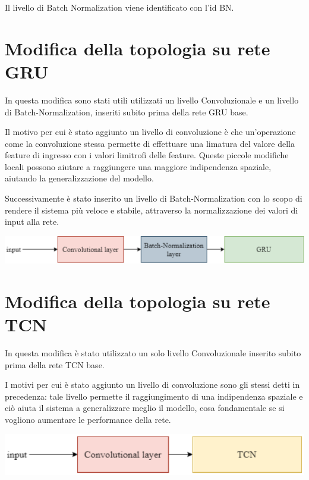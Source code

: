 
Il livello di Batch Normalization viene identificato con l'id BN.

\section{Modifica della topologia su rete GRU}
In questa modifica sono stati utili utilizzati un livello Convoluzionale e un livello di Batch-Normalization, inseriti subito prima della rete GRU base.

Il motivo per cui è stato aggiunto un livello di convoluzione è che un'operazione come la convoluzione stessa permette di effettuare una limatura del valore della feature di ingresso con i valori limitrofi delle feature. Queste piccole modifiche locali possono aiutare a raggiungere una maggiore indipendenza spaziale, aiutando la generalizzazione del modello.

Successivamente è stato inserito un livello di Batch-Normalization con lo scopo di rendere il sistema più veloce e stabile, attraverso la normalizzazione dei valori di input alla rete.

\vspace{0.25cm} 
\begin{center}
	\includegraphics[scale=0.8]{images/gru.eps}
	\label{Figura 1.}
\end{center}
\vspace{0.25cm}


\section{Modifica della topologia su rete TCN}
In questa modifica è stato utilizzato un solo livello Convoluzionale inserito subito prima della rete TCN base.

I motivi per cui è stato aggiunto un livello di convoluzione sono gli stessi detti in precedenza: tale livello permette il raggiungimento di una indipendenza spaziale e ciò aiuta il sistema a generalizzare meglio il modello, cosa fondamentale se si vogliono aumentare le performance della rete.
\vspace{0.25cm} 
\begin{center}
	\includegraphics[scale=0.8]{images/tcn.eps}
	\label{Figura 1.}
\end{center}
\vspace{0.25cm}
